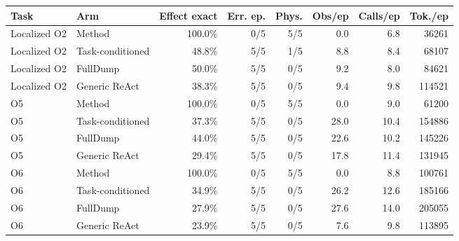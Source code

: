 \begin{tabular}{llrrrrrr}
\toprule
Task & Arm & Effect exact & Err. ep. & Phys. & Obs/ep & Calls/ep & Tok./ep \\
\midrule
Localized O2 & Method & 100.0\% & 0/5 & 5/5 & 0.0 & 6.8 & 36261 \\
Localized O2 & Task-conditioned & 48.8\% & 5/5 & 1/5 & 8.8 & 8.4 & 68107 \\
Localized O2 & FullDump & 50.0\% & 5/5 & 0/5 & 9.2 & 8.0 & 84621 \\
Localized O2 & Generic ReAct & 38.3\% & 5/5 & 0/5 & 9.4 & 9.8 & 114521 \\
O5 & Method & 100.0\% & 0/5 & 5/5 & 0.0 & 9.0 & 61200 \\
O5 & Task-conditioned & 37.3\% & 5/5 & 0/5 & 28.0 & 10.4 & 154886 \\
O5 & FullDump & 44.0\% & 5/5 & 0/5 & 22.6 & 10.2 & 145226 \\
O5 & Generic ReAct & 29.4\% & 5/5 & 0/5 & 17.8 & 11.4 & 131945 \\
O6 & Method & 100.0\% & 0/5 & 5/5 & 0.0 & 8.8 & 100761 \\
O6 & Task-conditioned & 34.9\% & 5/5 & 0/5 & 26.2 & 12.6 & 185166 \\
O6 & FullDump & 27.9\% & 5/5 & 0/5 & 27.6 & 14.0 & 205055 \\
O6 & Generic ReAct & 23.9\% & 5/5 & 0/5 & 7.6 & 9.8 & 113895 \\
\bottomrule
\end{tabular}
